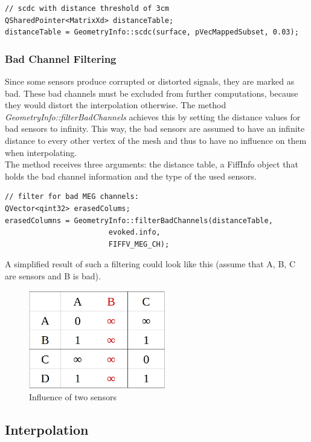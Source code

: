 \begin{lstlisting}
// scdc with distance threshold of 3cm
QSharedPointer<MatrixXd> distanceTable;
distanceTable = GeometryInfo::scdc(surface, pVecMappedSubset, 0.03);
\end{lstlisting}

\subsubsection{Bad Channel Filtering}

Since some sensors produce corrupted or distorted signals, they are marked as bad. These bad channels must be excluded from further computations, because they would distort the interpolation otherwise. The method \textit{GeometryInfo::filterBadChannels} achieves this by setting the distance values for bad sensors to infinity. This way, the bad sensors are assumed to have an infinite distance to every other vertex of the mesh and thus to have no influence on them when interpolating.\\
The method receives three arguments: the distance table, a FiffInfo object that holds the bad channel information and the type of the used sensors.

\begin{lstlisting}
// filter for bad MEG channels:
QVector<qint32> erasedColums;
erasedColumns = GeometryInfo::filterBadChannels(distanceTable,
						evoked.info,
						FIFFV_MEG_CH);
\end{lstlisting}

A simplified result of such a filtering could look like this (assume that A, B, C are sensors and B is bad).

\begin{figure}[h]
	\begin{center}
		\includegraphics[width=6cm]{figures/filteredBads.png}
		\caption{Influence of two sensors}
	\end{center}
\end{figure}

\clearpage 

\subsection{Interpolation}


